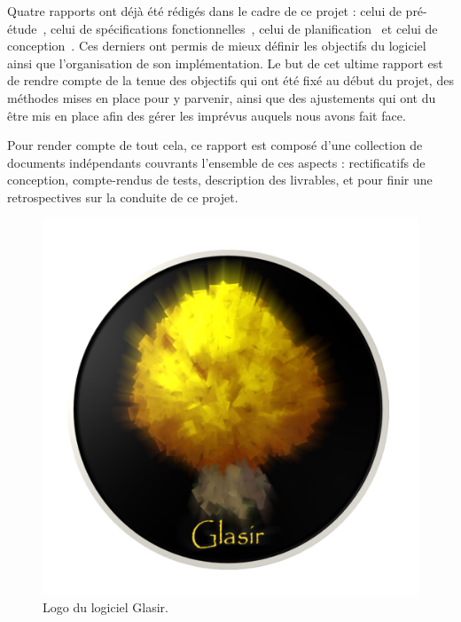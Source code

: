 Quatre rapports ont déjà été rédigés dans le cadre de ce projet : celui de pré-étude~\cite{pre_etude}, celui de spécifications fonctionnelles~\cite{spec_fonc}, celui de planification~\cite{planif} et celui de conception~\cite{conception}. Ces derniers ont permis de mieux définir les objectifs du logiciel ainsi que l'organisation de son implémentation. Le but de cet ultime rapport est de rendre compte de la tenue des objectifs qui ont été fixé au début du projet, des méthodes mises en place pour y parvenir, ainsi que des ajustements qui ont du être mis en place afin des gérer les imprévus auquels nous avons fait face. 

Pour render compte de tout cela, ce rapport est composé d'une collection de documents indépendants couvrants l'ensemble de ces aspects : rectificatifs de conception, compte-rendus de tests, description des livrables, et pour finir une retrospectives sur la conduite de ce projet.

    \vspace{4mm}

    \begin{figure}[H]
        \centering
        \includegraphics[height=0.5\textwidth]{figure/glasir.png}
        \caption{Logo du logiciel Glasir.}
        \label{fig:glasir}
    \end{figure}
